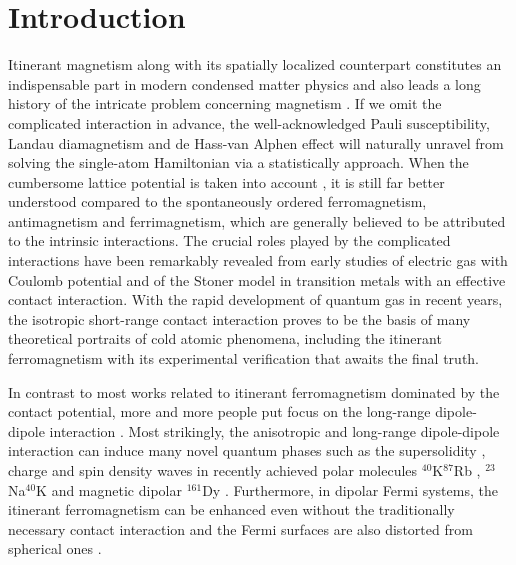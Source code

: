 \documentclass[twocolumn,english,pra,superscriptaddress]{revtex4-1}
\begin{document}
\section{Introduction}
Itinerant magnetism along with its spatially localized counterpart constitutes an indispensable part in modern condensed matter physics and also leads a long history of the intricate problem concerning magnetism \cite{wagner2013introduction,kubler2017theory,PhysRev.168.686}. If we omit the complicated interaction in advance, the well-acknowledged Pauli susceptibility, Landau diamagnetism and de Hass-van Alphen effect \cite{wagner2013introduction,kubler2017theory} will naturally unravel from solving the single-atom Hamiltonian via a statistically approach. When the cumbersome lattice potential is taken into account \cite{PhysRev.168.686}, it is still far better understood compared to the spontaneously ordered ferromagnetism, antimagnetism and ferrimagnetism, which are generally believed to be attributed to the intrinsic interactions. The crucial roles played by the complicated interactions have been remarkably revealed from early studies of electric gas \cite{1929Bemerkung,PhysRev.140.A1645} with Coulomb potential and of the Stoner model \cite{stoner1938collective,stoner1933xxx} in transition metals with an effective contact interaction. With the rapid development of quantum gas in recent years, the isotropic short-range contact interaction proves to be the basis of many theoretical portraits of cold atomic phenomena, including the itinerant ferromagnetism \cite{PhysRevLett.95.230403,PhysRevLett.105.030405,PhysRevA.85.043624,PhysRevA.93.063629,HE2014477,PhysRevLett.110.230401,zintchenko2016ferromagnetism,doi:10.7566/JPSJ.90.024004} with its experimental verification \cite{jo2009itinerant,RN28} that awaits the final truth. \par
In contrast to most works related to itinerant ferromagnetism dominated by the contact potential, more and more people put focus on the long-range dipole-dipole interaction \cite{PhysRevA.85.033615,PhysRevB.87.184424,2017JPhB...50a5302S,PhysRevA.98.023635,hu2022collisional,guo2022driven}.  Most strikingly, the anisotropic and long-range dipole-dipole interaction can induce many novel quantum phases such as the supersolidity \cite{PhysRevB.89.174511}, charge and spin density waves \cite{PhysRevB.91.224504,PhysRevA.87.043604} in recently achieved polar molecules $^{40}$K$^{87}$Rb \cite{K2008A,Bo2013Observation,PhysRevLett.108.080405,K2010Dipolar}, $^{23}$Na$^{40}$K \cite{PhysRevLett.109.085301} and magnetic dipolar $^{161}$Dy \cite{PhysRevLett.108.215301,PhysRevX.6.031022}. Furthermore, in dipolar Fermi systems, the itinerant ferromagnetism can be enhanced even without the traditionally necessary contact interaction \cite{20301,PhysRevA.105.053312,PhysRevLett.103.205301} and the Fermi surfaces are also distorted from spherical ones \cite{PhysRevA.77.061603,PhysRevA.81.033601,PhysRevLett.103.205301}.\par
\end{document}
